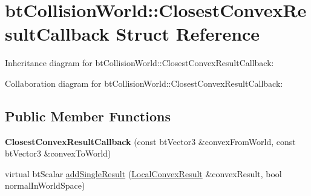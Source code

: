 \hypertarget{structbt_collision_world_1_1_closest_convex_result_callback}{\section{bt\+Collision\+World\+:\+:Closest\+Convex\+Result\+Callback Struct Reference}
\label{structbt_collision_world_1_1_closest_convex_result_callback}
}


Inheritance diagram for bt\+Collision\+World\+:\+:Closest\+Convex\+Result\+Callback\+:


Collaboration diagram for bt\+Collision\+World\+:\+:Closest\+Convex\+Result\+Callback\+:
\subsection*{Public Member Functions}
\begin{DoxyCompactItemize}
\item 
\hypertarget{structbt_collision_world_1_1_closest_convex_result_callback_aa3a9614ed8e472585105296eff35ed15}{{\bfseries Closest\+Convex\+Result\+Callback} (const bt\+Vector3 \&convex\+From\+World, const bt\+Vector3 \&convex\+To\+World)}\label{structbt_collision_world_1_1_closest_convex_result_callback_aa3a9614ed8e472585105296eff35ed15}

\item 
virtual bt\+Scalar \hyperlink{structbt_collision_world_1_1_closest_convex_result_callback_a9dee5c09f1bb54f868f34a28353b4505}{add\+Single\+Result} (\hyperlink{structbt_collision_world_1_1_local_convex_result}{Local\+Convex\+Result} \&convex\+Result, bool normal\+In\+World\+Space)
\end{DoxyCompactItemize}
